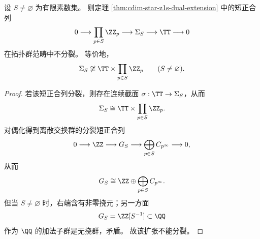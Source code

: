 \begin{theorem}\label{thm:xi-cdim-localization-solenoid-circle-extension-nonsplit}
设 \(S\neq\varnothing\) 为有限素数集。
则定理 \ref{thm:cdim-star-z1s-dual-extension} 中的短正合列
\[
0\longrightarrow \prod_{p\in S}\ZZ_p
\longrightarrow \Sigma_S
\longrightarrow \TT
\longrightarrow 0
\]
在拓扑群范畴中不分裂。
等价地，
\[
\Sigma_S\not\cong \TT\times \prod_{p\in S}\ZZ_p
\qquad (S\neq\varnothing).
\]
\end{theorem}
\begin{proof}
若该短正合列分裂，则存在连续截面 \(\sigma:\TT\to\Sigma_S\)，从而
\[
\Sigma_S\cong \TT\times \prod_{p\in S}\ZZ_p.
\]
对偶化得到离散交换群的分裂短正合列
\[
0\longrightarrow \ZZ
\longrightarrow G_S
\longrightarrow \bigoplus_{p\in S}C_{p^\infty}
\longrightarrow 0,
\]
从而
\[
G_S\cong \ZZ\oplus \bigoplus_{p\in S}C_{p^\infty}.
\]
但当 \(S\neq\varnothing\) 时，右端含有非零挠元；另一方面
\[
G_S=\ZZ[S^{-1}]\subset \QQ
\]
作为 \(\QQ\) 的加法子群是无挠群，矛盾。
故该扩张不能分裂。
\end{proof}



\endinput
